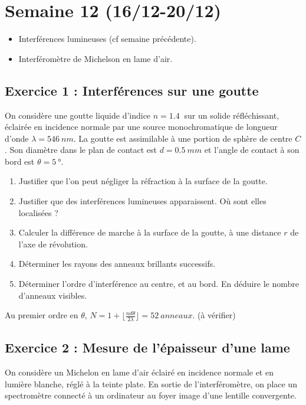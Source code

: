 \section{Semaine 12 (16/12-20/12) }


\begin{itemize}
	\item Interférences lumineuses (cf semaine précédente).
	\item Interféromètre de Michelson en lame d'air.
\end{itemize}

\subsection{Exercice 1 : Interférences sur une goutte}

On considère une goutte liquide d'indice $n=\SI{1.4}{}$ sur un solide réfléchissant, éclairée en incidence normale par une source monochromatique de longueur d'onde $\lambda = \SI{546}{nm}$. La goutte est assimilable à une portion de sphère de centre $C$. Son diamètre dans le plan de contact est $d=\SI{0.5}{mm}$ et l'angle de contact à son bord est $\theta = \SI{5}{\degree}$. 

\begin{enumerate}
	\item Justifier que l'on peut négliger la réfraction à la surface de la goutte.
	\item Justifier que des interférences lumineuses apparaissent. Où sont elles localisées ?
	\item Calculer la différence de marche à la surface de la goutte, à une distance $r$ de l'axe de révolution.
	\item Déterminer les rayons des anneaux brillants successifs.
	\item Déterminer l'ordre d'interférence au centre, et au bord. En déduire le nombre d'anneaux visibles.
\end{enumerate}

 Au premier ordre en $\theta$, $N = 1 + \lfloor \frac{n d \theta}{2 \lambda}\rfloor = \SI{52}{anneaux}$. (à vérifier)

\subsection{Exercice 2 : Mesure de l'épaisseur d'une lame}

On considère un Michelon en lame d'air éclairé en incidence normale et en lumière blanche, réglé à la teinte plate. En sortie de l'interféromètre, on place un spectromètre connecté à un ordinateur au foyer image d'une lentille convergente.


